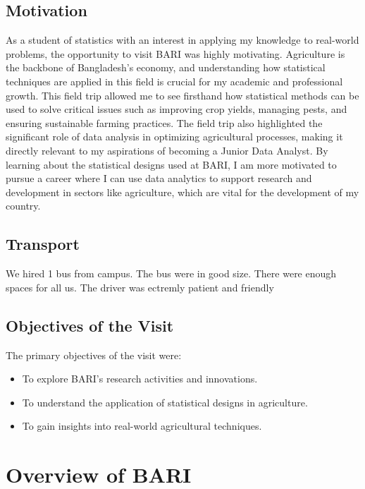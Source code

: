 \documentclass[oneside,12pt,fleqn]{book}
\begin{document}
\section{Motivation}
As a student of statistics with an interest in applying my knowledge to real-world problems, the opportunity to visit BARI was highly motivating. Agriculture is the backbone of Bangladesh’s economy, and understanding how statistical techniques are applied in this field is crucial for my academic and professional growth. This field trip allowed me to see firsthand how statistical methods can be used to solve critical issues such as improving crop yields, managing pests, and ensuring sustainable farming practices.
The field trip also highlighted the significant role of data analysis in optimizing agricultural processes, making it directly relevant to my aspirations of becoming a Junior Data Analyst. By learning about the statistical designs used at BARI, I am more motivated to pursue a career where I can use data analytics to support research and development in sectors like agriculture, which are vital for the development of my country.
\section{Transport}
We hired 1 bus from campus. The bus were in good size. There were enough spaces for all us. The driver was ectremly patient and friendly
\section{Objectives of the Visit}
The primary objectives of the visit were:
\begin{itemize}
    \item To explore BARI’s research activities and innovations.
    \item To understand the application of statistical designs in agriculture.
    \item To gain insights into real-world agricultural techniques.
\end{itemize}

\chapter{Overview of BARI}
\end{document}
